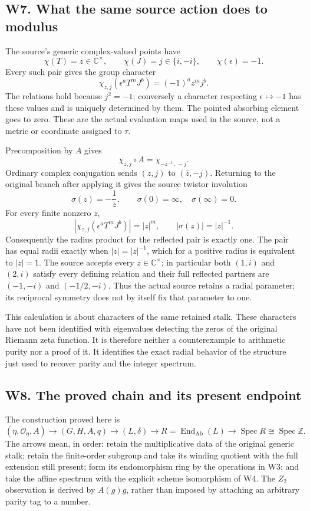 \documentclass[
  11pt,
]{article}
\begin{document}
\subsection{W7. What the same source action does to
modulus}\label{w7.-what-the-same-source-action-does-to-modulus}

The source's generic complex-valued points have \[
\chi(T)=z\in\mathbb C^\times,\qquad
\chi(J)=j\in\{i,-i\},\qquad
\chi(\epsilon)=-1.
\] Every such pair gives the group character \[
\chi_{z,j}(\epsilon^aT^mJ^b)=(-1)^a z^m j^b.
\] The relations hold because \(j^2=-1\); conversely a character
respecting \(\epsilon\mapsto-1\) has these values and is uniquely
determined by them. The pointed absorbing element goes to zero. These
are the actual evaluation maps used in the source, not a metric or
coordinate assigned to \(\tau\).

Precomposition by \(A\) gives \[
\chi_{z,j}\circ A=\chi_{-z^{-1},\,-j}.
\] Ordinary complex conjugation sends \((z,j)\) to \((\bar z,-j)\).
Returning to the original branch after applying it gives the source
twistor involution \[
\sigma(z)=-\frac1{\bar z},\qquad\sigma(0)=\infty,\quad\sigma(\infty)=0.
\] For every finite nonzero \(z\), \[
|\chi_{z,j}(\epsilon^aT^mJ^b)|=|z|^m,
\qquad |\sigma(z)|=|z|^{-1}.
\] Consequently the radius product for the reflected pair is exactly
one. The pair has equal radii exactly when \(|z|=|z|^{-1}\), which for a
positive radius is equivalent to \(|z|=1\). The source accepts every
\(z\in\mathbb C^\times\); in particular both \((1,i)\) and \((2,i)\)
satisfy every defining relation and their full reflected partners are
\((-1,-i)\) and \((-1/2,-i)\). Thus the actual source retains a radial
parameter; its reciprocal symmetry does not by itself fix that parameter
to one.

This calculation is about characters of the same retained stalk. These
characters have not been identified with eigenvalues detecting the zeros
of the original Riemann zeta function. It is therefore neither a
counterexample to arithmetic purity nor a proof of it. It identifies the
exact radial behavior of the structure just used to recover parity and
the integer spectrum.

\subsection{W8. The proved chain and its present
endpoint}\label{w8.-the-proved-chain-and-its-present-endpoint}

The construction proved here is \[
(\eta,\mathcal O_\eta,A)
\longrightarrow (G,H,A,q)
\longrightarrow (L,\delta)
\longrightarrow R=\operatorname{End}_{\mathrm{Ab}}(L)
\longrightarrow\operatorname{Spec}R\cong\operatorname{Spec}\mathbb Z.
\] The arrows mean, in order: retain the multiplicative data of the
original generic stalk; retain the finite-order subgroup and take its
winding quotient with the full extension still present; form its
endomorphism ring by the operations in W3; and take the affine spectrum
with the explicit scheme isomorphism of W4. The \(Z_2\) observation is
derived by \(A(g)g\), rather than imposed by attaching an arbitrary
parity tag to a number.
\end{document}
